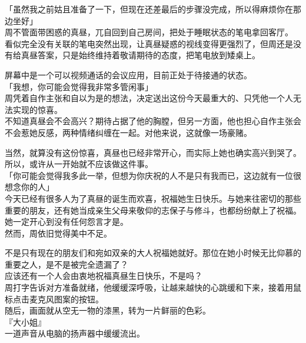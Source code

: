 「虽然我之前姑且准备了一下，但现在还差最后的步骤没完成，所以得麻烦你在那边坐好」\\

周不管面带困惑的真昼，兀自回到自己房间，把处于睡眠状态的笔电拿回客厅。\\

看似完全没有关联的笔电突然出现，让真昼疑惑的视线变得更强烈了，但周还是没有给真昼答案，只是始终维持着敬请期待的态度，把笔电放到矮桌上。

屏幕中是一个可以视频通话的会议应用，目前正处于待接通的状态。\\

「我想，你可能会觉得我非常多管闲事」\\

周凭着自作主张和自以为是的想法，决定送出这份今天最重大的、只凭他一个人无法实现的惊喜。\\

不知道真昼会不会高兴？期待占据了他的胸膛，但另一方面，他也担心自作主张会不会惹她反感，两种情绪纠缠在一起。对他来说，这就像一场豪赌。

当然，就算没有这份惊喜，真昼也已经非常开心，而实际上她也确实高兴到哭了。所以，或许从一开始就不应该做这件事。\\

「你可能会觉得我多此一举，但想为你庆祝的人不是只有我而已，这边就有一位很想念你的人」\\

今天已经有很多人为了真昼的诞生而欢喜，祝福她生日快乐。与她来往密切的那些重要的朋友，还有她当成亲生父母来敬仰的志保子与修斗，也都纷纷献上了祝福。\\

她一定开心到没有任何怨言才是。\\

然而，周依旧觉得美中不足。

不是只有现在的朋友们和宛如双亲的大人祝福她就好。那位在她小时候无比仰慕的重要之人，是不是被完全遗漏了？\\

应该还有一个人会由衷地祝福真昼生日快乐，不是吗？\\

周打字告诉对方准备就绪，他缓缓深呼吸，让越来越快的心跳缓和下来，接着用鼠标点击麦克风图案的按钮。\\

随后，画面就从空无一物的漆黑，转为一片鲜丽的色彩。\\

『大小姐』\\

一道声音从电脑的扬声器中缓缓流出。\\

